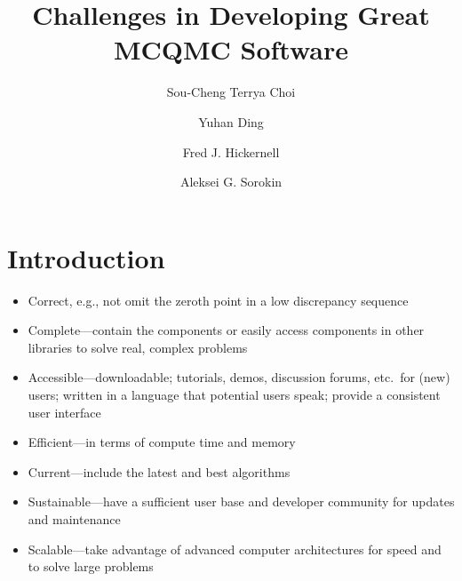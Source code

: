 \documentclass[graybox]{svmult}
\begin{document}
\title*{Challenges in Developing Great MCQMC Software}
\author{Sou-Cheng Terrya Choi \and Yuhan Ding \and Fred J. Hickernell \and Aleksei G. Sorokin}

\maketitle

\abstract{}


\section{Introduction}

	\begin{itemize}
	\item Correct, e.g., not omit the zeroth point in a low discrepancy sequence \cite{Owe22a, scipySobol2020a}
	
	\item  Complete---contain the components or  easily access components in other libraries to solve real, complex problems
	
	\item  Accessible---downloadable; tutorials, demos, discussion forums, etc.\ for (new) users; written in a language that potential users speak; provide a consistent user interface
	
	\item Efficient---in terms of compute time and memory
	
	\item Current---include the latest and best algorithms
	
	\item  Sustainable---have a sufficient user base and developer community for updates and maintenance
	
	\item Scalable---take advantage of advanced computer architectures for speed and to solve large problems
	
\end{itemize}
\end{document}
